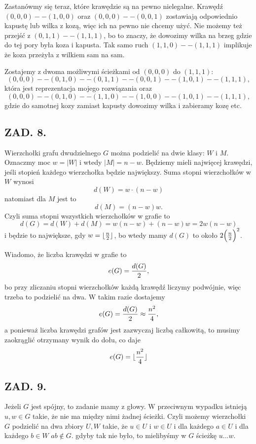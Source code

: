 \documentclass{article}[13pt]
\begin{document}
    Zastanówmy się teraz, które krawędzie są na pewno nielegalne. Krawędź $(0,0,0)--(1,0,0)$ oraz $(0,0,0)--(0,0,1)$ zostawiają odpowiednio kapustę lub wilka z kozą, więc ich na pewno nie chcemy użyć. Nie możemy też przejść z $(0,1,1)--(1,1,1)$, bo to znaczy, że dowozimy wilka na brzeg gdzie do tej pory była koza i kapusta. Tak samo ruch $(1,1,0)--(1,1,1)$ implikuje że koza przeżyła z wilkiem sam na sam.

    Zostajemy z dwoma możliwymi ścieżkami od $(0,0,0)$ do $(1,1,1)$:
    $$(0,0,0)--(0,1,0)--(0,1,1)--(0,0,1)--(1,0,1)--(1,1,1),$$
    która jest reprezentacja mojego rozwiązania oraz
    $$(0,0,0)--(0,1,0)--(1,1,0)--(1,0,0)--(1,0,1)--(1,1,1),$$
    gdzie do samotnej kozy zamiast kapusty dowozimy wilka i zabieramy kozę etc.

    \subsection*{ZAD. 8.}

    Wierzchołki grafu dwudzielnego $G$ można podzielić na dwie klasy: $W$ i $M$. Oznaczmy moc $w=|W|$ i wtedy $|M|=n-w$. Będziemy mieli najwięcej krawędzi, jeśli stopień każdego wierzchołka będzie największy. Suma stopni wierzchołków w $W$ wynosi
    $$d(W)=w\cdot(n-w)$$
    natomiast dla $M$ jest to
    $$d(M)=(n-w)w.$$
    Czyli suma stopni wszystkich wierzchołków w grafie to
    $$d(G)=d(W)+d(M)=w(n-w)+(n-w)w=2w(n-w)$$
    i będzie to największe, gdy $w=\lfloor {n\over2}\rfloor$, bo wtedy mamy $d(G)$ to około $2\Big({n\over2}\Big)^2$.

    Wiadomo, że liczba krawędzi w grafie to
    $$e(G)={d(G)\over2},$$
    bo przy zliczaniu stopni wierzchołków każdą krawędź liczymy podwójnie, więc trzeba to podzielić na dwa. W takim razie dostajemy
    $$e(G)={d(G)\over 2}\approx{n^2\over4},$$
    a ponieważ liczba krawędzi grafów jest zazwyczaj liczbą całkowitą, to musimy zaokrąglić otrzymany wynik do dołu, co daje
    $$e(G)=\lfloor{n^2\over4}\rfloor$$
    
    \subsection*{ZAD. 9.}

    Jeżeli $G$ jest spójny, to zadanie mamy z głowy. W przeciwnym wypadku istnieją $u,w\in G$ takie, że nie ma między nimi żadnej ścieżki. Czyli możemy wierzchołki $G$ podzielić na dwa zbiory $U,W$ takie, że $u\in U$ i $w\in U$ i dla każdego $a\in U$ i dla każdego $b\in W$ $ab\notin G$. gdyby tak nie było, to mielibyśmy w $G$ ścieżkę $u...w$.
    
\end{document}
